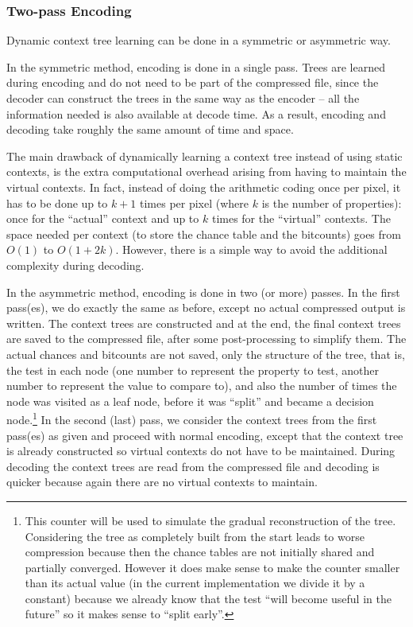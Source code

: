 \documentclass[a4paper,USenglish]{lipics}
\begin{document}
\subsubsection{Two-pass Encoding}
Dynamic context tree learning can be done in a symmetric or asymmetric way.

In the symmetric method, encoding is done in a single pass. Trees are learned during encoding and do not need to be
part of the compressed file, since the decoder can construct the trees in the same way as the encoder -- all the information
needed is also available at decode time. As a result, encoding and decoding take roughly the same amount of time and space.

The main drawback of dynamically learning a context tree instead of using static contexts,
is the extra computational overhead arising from having to maintain the virtual contexts.
In fact, instead of doing the arithmetic coding once per pixel, it has to be done
up to $k+1$ times per pixel (where $k$ is the number of properties):
once for the ``actual'' context and up to $k$ times for the ``virtual'' contexts. The space needed per context
(to store the chance table and the bitcounts) goes from $O(1)$ to $O(1+2k)$.
However, there is a simple way to avoid the additional complexity during decoding.

In the asymmetric method, encoding is done in two (or more) passes.
In the first pass(es), we do exactly the same as before, except no actual compressed output is written.
The context trees are constructed and at the end, the final context trees are saved to the compressed file,
after some post-processing to simplify them. The actual chances and bitcounts are not saved, only the structure of the tree,
that is, the test in each node (one number to represent the property to test, another number to represent the value to compare to),
and also the number of times the node was visited as a leaf node, before it was ``split'' and became a decision node.\footnote{
This counter will be used to simulate the gradual reconstruction of the tree. Considering the tree as completely built from the start
leads to worse compression because then the chance tables are not initially shared and partially converged. However it does make sense
to make the counter smaller than its actual value (in the current implementation we divide it by a constant) because we already know
that the test ``will become useful in the future'' so it makes sense to ``split early''.}
In the second (last) pass, we consider the context trees
from the first pass(es) as given and proceed with normal encoding,
except that the context tree is already constructed so virtual contexts do not have to be maintained.
During decoding the context trees are read from the compressed file and decoding is quicker
because again there are no virtual contexts to maintain.
\end{document}
